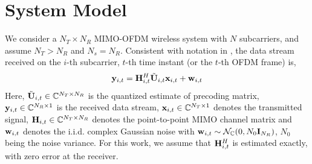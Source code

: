 \documentclass[conference]{IEEEtran}
\begin{document}
{\section{System Model}
\label{section2}
\vspace{-1pt}
We consider a $N_T\times N_R$ MIMO-OFDM wireless system with $N$ subcarriers, and assume $N_T > N_R$ and $N_s = N_R$.
Consistent with notation in \cite{6891198,Gupt1905:Predictive}, the data stream received on the $i$-th subcarrier, $t$-th time instant (or the $t$-th OFDM frame) is,
\vspace{-1pt}
\begin{equation}
{\bf y}_{i,t}={\bf H}^{H}_{i,t}\tilde{{\bf U}}_{i,t}{\bf x}_{i,t}+ {\bf w}_{i,t}
\end{equation}
\vspace{-1pt}
Here, $\tilde{{\bf U}}_{i,t} \in \mathbb{C}^{N_T \times N_R}$ is the quantized estimate of precoding matrix, ${\bf y}_{i,t} \in \mathbb{C}^{N_R \times 1}$ is the received data stream, ${\bf x}_{i,t} \in \mathbb{C}^{N_T \times 1}$ denotes the transmitted signal, ${\bf H}_{i,t} \in \mathbb{C}^{N_T \times N_R}$ denotes the point-to-point MIMO channel matrix and ${\bf w}_{i,t}$ denotes the i.i.d. complex Gaussian noise with ${\bf w}_{i,t} \sim \mathcal{N}_{\mathbb{C}}(0,N_0{\bf I}_{N_R})$, $N_0$ being the noise variance. For this work, we assume that ${\bf H}^{H}_{i,t}$ is estimated exactly, with zero error at the receiver.



}
\end{document}
